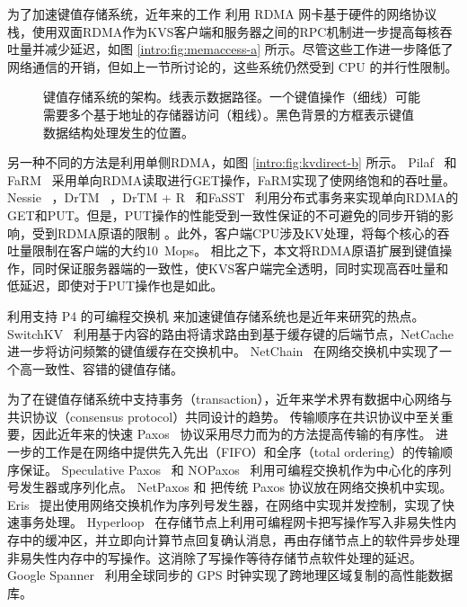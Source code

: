 为了加速键值存储系统，近年来的工作 \cite {kalia2014using,kalia2016design,kalia2014using,kalia2016design} 利用 RDMA 网卡基于硬件的网络协议栈，使用双面RDMA作为KVS客户端和服务器之间的RPC机制进一步提高每核吞吐量并减少延迟，如图 \ref{intro:fig:memaccess-a} 所示。尽管这些工作进一步降低了网络通信的开销，但如上一节所讨论的，这些系统仍然受到 CPU 的并行性限制。


\begin{figure}[t]
	\centering
	\caption{键值存储系统的架构。线表示数据路径。一个键值操作（细线）可能需要多个基于地址的存储器访问（粗线）。黑色背景的方框表示键值数据结构处理发生的位置。}
	\label{intro:fig:kvdirect}
\end{figure}

另一种不同的方法是利用单侧RDMA，如图 \ref{intro:fig:kvdirect-b} 所示。 Pilaf~ \cite {mitchell2013using} 和FaRM~ \cite {dragojevic2014farm} 采用单向RDMA读取进行GET操作，FaRM实现了使网络饱和的吞吐量。 Nessie~ \cite {szepesi2014designing}，DrTM~ \cite {wei2015fast}，DrTM + R~ \cite {chen2016fast} 和FaSST~ \cite {kalia2016fasst} 利用分布式事务来实现单向RDMA的GET和PUT。但是，PUT操作的性能受到一致性保证的不可避免的同步开销的影响，受到RDMA原语的限制 \cite {kalia2016design}。此外，客户端CPU涉及KV处理，将每个核心的吞吐量限制在客户端的大约10~Mops。
相比之下，本文将RDMA原语扩展到键值操作，同时保证服务器端的一致性，使KVS客户端完全透明，同时实现高吞吐量和低延迟，即使对于PUT操作也是如此。

利用支持 P4 \cite{bosshart2014p4} 的可编程交换机 \cite{barefoot-tofino} 来加速键值存储系统也是近年来研究的热点。
SwitchKV~\cite {li2016fast} 利用基于内容的路由将请求路由到基于缓存键的后端节点，NetCache~ \cite {netcache-sosp17} 进一步将访问频繁的键值缓存在交换机中。
NetChain~\cite{jin2018netchain} 在网络交换机中实现了一个高一致性、容错的键值存储。

为了在键值存储系统中支持事务（transaction），近年来学术界有数据中心网络与共识协议（consensus protocol）共同设计的趋势。
传输顺序在共识协议中至关重要，因此近年来的快速 Paxos~\cite{lamport2006fast,kemme1999processing,moraru2013there,pedone1998optimistic} 协议采用尽力而为的方法提高传输的有序性。
进一步的工作是在网络中提供先入先出（FIFO）和全序（total ordering）的传输顺序保证。
Speculative Paxos~\cite{ports2015designing} 和 NOPaxos~\cite{li2016just} 利用可编程交换机作为中心化的序列号发生器或序列化点。
NetPaxos \cite{dang2015netpaxos,dang2016paxos} 和 \cite{dang2016network} 把传统 Paxos 协议放在网络交换机中实现。
Eris~\cite{eris} 提出使用网络交换机作为序列号发生器，在网络中实现并发控制，实现了快速事务处理。
Hyperloop~\cite{kim2018hyperloop} 在存储节点上利用可编程网卡把写操作写入非易失性内存中的缓冲区，并立即向计算节点回复确认消息，再由存储节点上的软件异步处理非易失性内存中的写操作。这消除了写操作等待存储节点软件处理的延迟。
Google Spanner~\cite{corbett2013spanner} 利用全球同步的 GPS 时钟实现了跨地理区域复制的高性能数据库。



